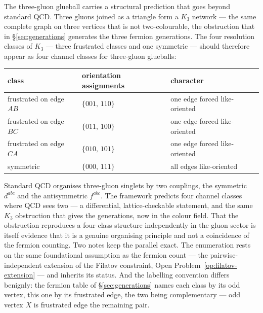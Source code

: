 The three-gluon glueball carries a structural prediction that goes beyond standard QCD. Three gluons
joined as a triangle form a $K_3$ network --- the same complete graph on three vertices that is not
two-colourable, the obstruction that in \S\ref{sec:generations} generates the three fermion
generations. The four resolution classes of $K_3$ --- three frustrated classes and one symmetric ---
should therefore appear as four channel classes for three-gluon glueballs:

\begin{center}
\begin{tabular}{lll}
\hline
class & orientation assignments & character \\
\hline
frustrated on edge $AB$ & $\{001,\,110\}$ & one edge forced like-oriented \\
frustrated on edge $BC$ & $\{011,\,100\}$ & one edge forced like-oriented \\
frustrated on edge $CA$ & $\{010,\,101\}$ & one edge forced like-oriented \\
symmetric               & $\{000,\,111\}$ & all edges like-oriented \\
\hline
\end{tabular}
\end{center}

Standard QCD organises three-gluon singlets by two couplings, the symmetric $d^{abc}$ and the
antisymmetric $f^{abc}$. The framework predicts four channel classes where QCD sees two --- a
differential, lattice-checkable statement, and the same $K_3$ obstruction that gives the generations,
now in the colour field. That the obstruction reproduces a four-class structure independently in the
gluon sector is itself evidence that it is a genuine organising principle and not a coincidence of
the fermion counting. Two notes keep the parallel exact. The enumeration rests on the same
foundational assumption as the fermion count --- the pairwise-independent extension of the Filatov
constraint, Open Problem~\ref{op:filatov-extension} --- and inherits its status. And the labelling
convention differs benignly: the fermion table of \S\ref{sec:generations} names each class by its
odd vertex, this one by its frustrated edge, the two being complementary --- odd vertex $X$ is
frustrated edge the remaining pair.

